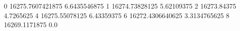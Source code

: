 0 16275.7607421875 6.6435546875
1 16274.73828125 5.62109375
2 16273.84375 4.7265625
4 16275.55078125 6.43359375
6 16272.4306640625 3.3134765625
8 16269.1171875 0.0
